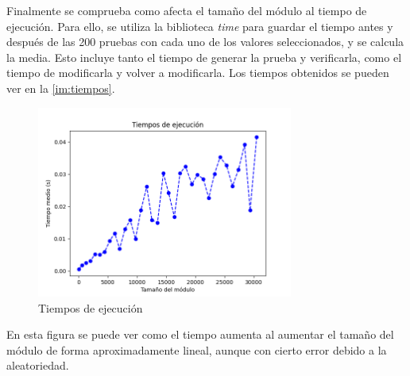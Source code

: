 Finalmente se comprueba como afecta el tamaño del módulo al tiempo de ejecución. Para ello, se utiliza la biblioteca \emph{time} para guardar el tiempo antes y después de las 200 pruebas con cada uno de los valores seleccionados, y se calcula la media. Esto incluye tanto el tiempo de generar la prueba y verificarla, como el tiempo de modificarla y volver a modificarla. Los tiempos obtenidos se pueden ver en la \autoref{im:tiempos}.

\begin{figure}[H]
    \centering
    \includegraphics[width=0.75\textwidth]{images/tiempos.png}
    \caption{Tiempos de ejecución}
    \label{im:tiempos}
\end{figure}

En esta figura se puede ver como el tiempo aumenta al aumentar el tamaño del módulo de forma aproximadamente lineal, aunque con cierto error debido a la aleatoriedad.